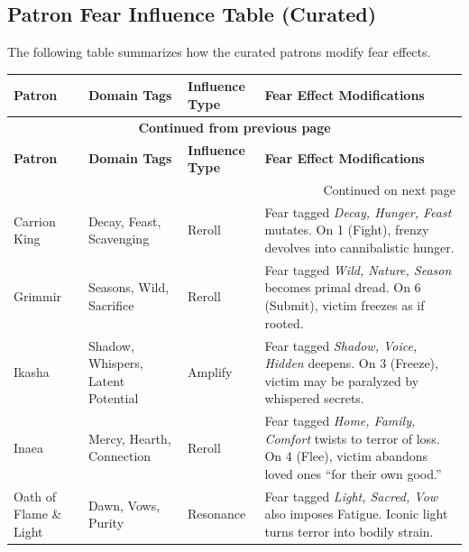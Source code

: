 \label{tab:gift-thematic-map-curated}

\subsection{Patron Fear Influence Table (Curated)}
\label{subsec:patron-fear-table-curated}

The following table summarizes how the curated patrons modify fear effects.

\begin{longtable}{@{}p{3.2cm}p{4.5cm}p{2.8cm}p{5.9cm}@{}}
\toprule
\textbf{Patron} & \textbf{Domain Tags} & \textbf{Influence Type} & \textbf{Fear Effect Modifications} \\
\midrule
\endfirsthead
\multicolumn{4}{c}{{\bfseries Continued from previous page}} \\
\toprule
\textbf{Patron} & \textbf{Domain Tags} & \textbf{Influence Type} & \textbf{Fear Effect Modifications} \\
\midrule
\endhead
\midrule
\multicolumn{4}{r}{{Continued on next page}} \\
\endfoot
\bottomrule
\endlastfoot

Carrion King & Decay, Feast, Scavenging & Reroll & 
Fear tagged \emph{Decay, Hunger, Feast} mutates. On 1 (Fight), frenzy devolves into cannibalistic hunger. \\

Grimmir & Seasons, Wild, Sacrifice & Reroll & 
Fear tagged \emph{Wild, Nature, Season} becomes primal dread. On 6 (Submit), victim freezes as if rooted. \\

Ikasha & Shadow, Whispers, Latent Potential & Amplify & 
Fear tagged \emph{Shadow, Voice, Hidden} deepens. On 3 (Freeze), victim may be paralyzed by whispered secrets. \\

Inaea & Mercy, Hearth, Connection & Reroll & 
Fear tagged \emph{Home, Family, Comfort} twists to terror of loss. On 4 (Flee), victim abandons loved ones ``for their own good.'' \\

Oath of Flame \& Light & Dawn, Vows, Purity & Resonance & 
Fear tagged \emph{Light, Sacred, Vow} also imposes Fatigue. Iconic light turns terror into bodily strain. \\


\end{longtable}
